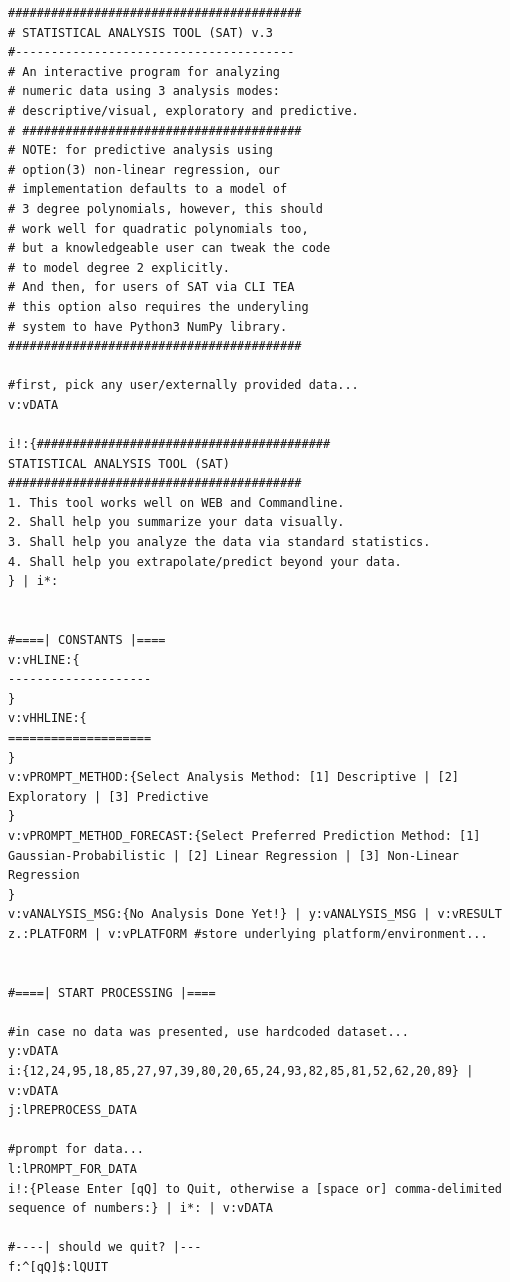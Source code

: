 \documentclass[a4paper, 18pt]{book} %
\begin{document}
{
  \begin{tcolorbox}[teaterminalstyle, title=TEA Program:  Statistical Analysis Tool (SAT), breakable]
  \begin{lstlisting}[language=TEA,breaklines=true,]
#########################################
# STATISTICAL ANALYSIS TOOL (SAT) v.3
#---------------------------------------
# An interactive program for analyzing
# numeric data using 3 analysis modes:
# descriptive/visual, exploratory and predictive.
# #######################################
# NOTE: for predictive analysis using
# option(3) non-linear regression, our
# implementation defaults to a model of 
# 3 degree polynomials, however, this should
# work well for quadratic polynomials too,
# but a knowledgeable user can tweak the code
# to model degree 2 explicitly.
# And then, for users of SAT via CLI TEA
# this option also requires the underyling
# system to have Python3 NumPy library.
#########################################

#first, pick any user/externally provided data...
v:vDATA

i!:{#########################################
STATISTICAL ANALYSIS TOOL (SAT)
#########################################
1. This tool works well on WEB and Commandline.
2. Shall help you summarize your data visually.
3. Shall help you analyze the data via standard statistics.
4. Shall help you extrapolate/predict beyond your data.
} | i*:


#====| CONSTANTS |====
v:vHLINE:{
--------------------
}
v:vHHLINE:{
====================
}
v:vPROMPT_METHOD:{Select Analysis Method: [1] Descriptive | [2] Exploratory | [3] Predictive
}
v:vPROMPT_METHOD_FORECAST:{Select Preferred Prediction Method: [1] Gaussian-Probabilistic | [2] Linear Regression | [3] Non-Linear Regression
}
v:vANALYSIS_MSG:{No Analysis Done Yet!} | y:vANALYSIS_MSG | v:vRESULT
z.:PLATFORM | v:vPLATFORM #store underlying platform/environment...


#====| START PROCESSING |====

#in case no data was presented, use hardcoded dataset...
y:vDATA
i:{12,24,95,18,85,27,97,39,80,20,65,24,93,82,85,81,52,62,20,89} | v:vDATA
j:lPREPROCESS_DATA

#prompt for data...
l:lPROMPT_FOR_DATA
i!:{Please Enter [qQ] to Quit, otherwise a [space or] comma-delimited sequence of numbers:} | i*: | v:vDATA

#----| should we quit? |---
f:^[qQ]$:lQUIT


\end{lstlisting}
\end{tcolorbox}}
\end{document}
